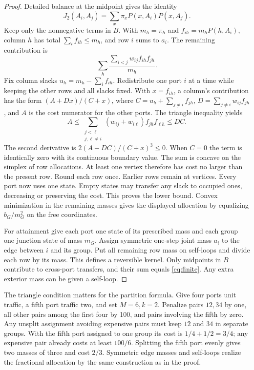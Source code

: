 \documentclass[11pt]{article}
\begin{document}
\begin{proof}
Detailed balance at the midpoint gives the identity
\[
 J_2(A_i,A_j)=\sum_x\pi_x P(x,A_i)P(x,A_j).
\]
Keep only the nonnegative terms in \(B\). With \(m_h=\pi_h\) and \(f_{ih}=m_h P(h,A_i)\), column \(h\) has total \(\sum_i f_{ih}\le m_h\), and row \(i\) sums to \(a_i\). The remaining contribution is
\begin{equation}
 \sum_h \frac{\sum_{i<j} w_{ij} f_{ih}f_{jh}}{m_h}.
 \label{eq:allocation}
\end{equation}
Fix column slacks \(u_h=m_h-\sum_i f_{ih}\). Redistribute one port \(i\) at a time while keeping the other rows and all slacks fixed. With \(x=f_{ih}\), a column's contribution has the form \((A+Dx)/(C+x)\), where \(C=u_h+\sum_{j\ne i}f_{jh}\), \(D=\sum_{j\ne i} w_{ij}f_{jh}\), and \(A\) is the cost numerator for the other ports. The triangle inequality yields
\[
 A\le\sum_{\substack{j<\ell\\j,\ell\ne i}}(w_{ij}+w_{i\ell})f_{jh}f_{\ell h}
 \le DC .
\]
The second derivative is \(2(A-DC)/(C+x)^3\le0\). When \(C=0\) the term is identically zero with its continuous boundary value. The sum is concave on the simplex of row allocations. At least one vertex therefore has cost no larger than the present row. Round each row once. Earlier rows remain at vertices. Every port now uses one state. Empty states may transfer any slack to occupied ones, decreasing or preserving the cost. This proves the lower bound. Convex minimization in the remaining masses gives the displayed allocation by equalizing \(b_G/m_G^2\) on the free coordinates.

For attainment give each port one state of its prescribed mass and each group one junction state of mass \(m_G\). Assign symmetric one-step joint mass \(a_i\) to the edge between \(i\) and its group. Put all remaining row mass on self-loops and divide each row by its mass. This defines a reversible kernel. Only midpoints in \(B\) contribute to cross-port transfers, and their sum equals \eqref{eq:finite}. Any extra exterior mass can be given a self-loop.
\end{proof}

The triangle condition matters for the partition formula. Give four ports unit traffic, a fifth port traffic two, and set \(M=6,k=2\). Penalize pairs \(12,34\) by one, all other pairs among the first four by 100, and pairs involving the fifth by zero. Any unsplit assignment avoiding expensive pairs must keep \(12\) and \(34\) in separate groups. With the fifth port assigned to one group its cost is \(1/4+1/2=3/4\); any expensive pair already costs at least \(100/6\). Splitting the fifth port evenly gives two masses of three and cost \(2/3\). Symmetric edge masses and self-loops realize the fractional allocation by the same construction as in the proof.
\end{document}
